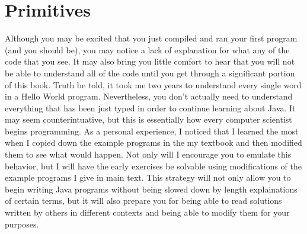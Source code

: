 


\chapter{Primitives}


Although you may be excited that you just compiled and ran your first program (and you should be), you may notice a lack of explanation for what any of the code that you see.
It may also bring you little comfort to hear that you will not be able to understand all of the code until you get through a significant portion of this book.
Truth be told, it took me two years to understand every single word in a Hello World program.
Nevertheless, you don't actually need to understand everything that has been just typed in order to continue learning about Java.
It may seem counterintuative, but this is essentially how every computer scientist begins programming.
As a personal experience, I noticed that I learned the most when I copied down the example programs in the my textbook and then modified them to see what would happen.
Not only will I encourage you to emulate this behavior, but I will have the early exercises be solvable using modifications of the example programs I give in main text.
This strategy will not only allow you to begin writing Java programs without being slowed down by length explainations of certain terms, but it will also prepare you for being able to read solutions written by others in different contexts and being able to modify them for your purposes.








